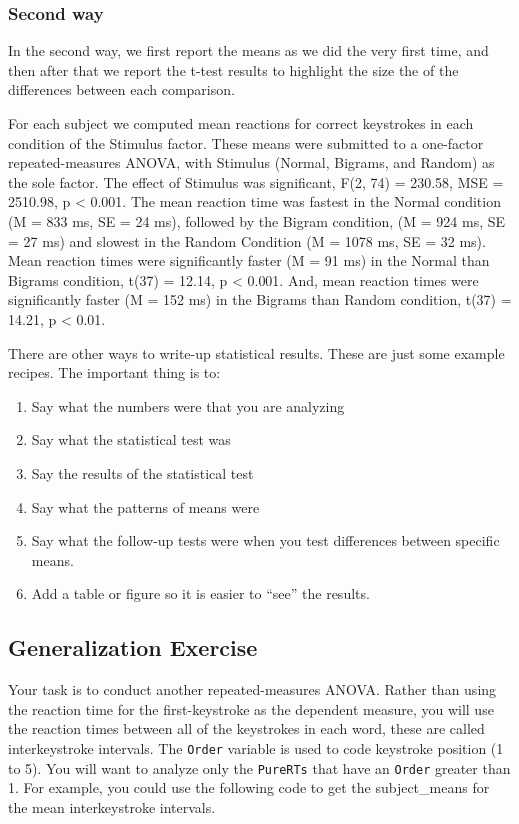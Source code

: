 \documentclass[]{book}
\providecommand{\tightlist}{%
  \setlength{\itemsep}{0pt}\setlength{\parskip}{0pt}}
\begin{document}
\subsubsection{Second way}\label{second-way}

In the second way, we first report the means as we did the very first
time, and then after that we report the t-test results to highlight the
size the of the differences between each comparison.

For each subject we computed mean reactions for correct keystrokes in
each condition of the Stimulus factor. These means were submitted to a
one-factor repeated-measures ANOVA, with Stimulus (Normal, Bigrams, and
Random) as the sole factor. The effect of Stimulus was significant, F(2,
74) = 230.58, MSE = 2510.98, p \textless{} 0.001. The mean reaction time
was fastest in the Normal condition (M = 833 ms, SE = 24 ms), followed
by the Bigram condition, (M = 924 ms, SE = 27 ms) and slowest in the
Random Condition (M = 1078 ms, SE = 32 ms). Mean reaction times were
significantly faster (M = 91 ms) in the Normal than Bigrams condition,
t(37) = 12.14, p \textless{} 0.001. And, mean reaction times were
significantly faster (M = 152 ms) in the Bigrams than Random condition,
t(37) = 14.21, p \textless{} 0.01.

There are other ways to write-up statistical results. These are just
some example recipes. The important thing is to:

\begin{enumerate}
\def\labelenumi{\arabic{enumi}.}
\tightlist
\item
  Say what the numbers were that you are analyzing
\item
  Say what the statistical test was
\item
  Say the results of the statistical test
\item
  Say what the patterns of means were
\item
  Say what the follow-up tests were when you test differences between
  specific means.
\item
  Add a table or figure so it is easier to ``see'' the results.
\end{enumerate}

\subsection{Generalization Exercise}\label{generalization-exercise-8}

Your task is to conduct another repeated-measures ANOVA. Rather than
using the reaction time for the first-keystroke as the dependent
measure, you will use the reaction times between all of the keystrokes
in each word, these are called interkeystroke intervals. The
\texttt{Order} variable is used to code keystroke position (1 to 5). You
will want to analyze only the \texttt{PureRTs} that have an
\texttt{Order} greater than 1. For example, you could use the following
code to get the subject\_means for the mean interkeystroke intervals.
\end{document}
